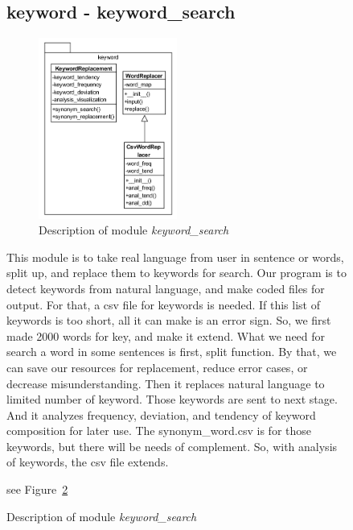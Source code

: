 \documentclass[conference]{IEEEtran}
\begin{document}
\begin{itemize}
\begin{itemize}
\begin{itemize}
\begin{itemize}
\begin{figure}[h]
\begin{enumerate}
\begin{itemize}
\begin{enumerate}
\subsection{keyword - keyword\_search} %
\label{sub:keyword_search}
\begin{figure}[ht]
\centering
\includegraphics[width=0.5\textwidth]{./figures/keyword_search.png}
\caption{Description of module \textit{keyword\_search}}
\label{keyword_search}
\end{figure}


This module is to take real language from user in sentence or words, split up, and replace them to keywords for search. Our program is to detect keywords from natural language, and make coded files for output. For that, a csv file for keywords is needed. If this list of keywords is too short, all it can make is an error sign. So, we first made 2000 words for key, and make it extend. What we need for search a word in some sentences is first, split function. By that, we can save our resources for replacement, reduce error cases, or decrease misunderstanding. Then it replaces natural language to limited number of keyword. Those keywords are sent to next stage. And it analyzes frequency, deviation, and tendency of keyword composition for later use. The synonym\_word.csv is for those keywords, but there will be needs of complement. So, with analysis of keywords, the csv file extends. 


see Figure~\ref{keyword_search}


\end{enumerate}
\end{itemize}
\end{enumerate}
\end{figure}
\end{itemize}
\end{itemize}
\end{itemize}
\end{itemize}
\end{document}
